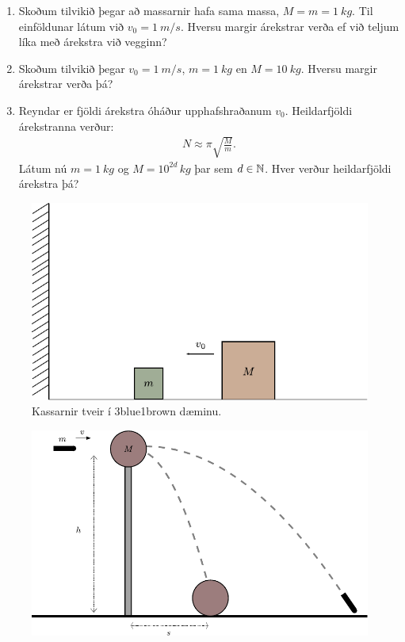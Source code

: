 \begin{enumerate}[label = \textbf{Dæmi \thechapter.\arabic*.}]
\begin{enumerate}[label = \textbf{(\alph*)}]
    \item Skoðum tilvikið þegar að massarnir hafa sama massa, $M = m = \SI{1}{kg}$. Til einföldunar látum við $v_0 = \SI{1}{m/s}$. Hversu margir árekstrar verða ef við teljum líka með árekstra við vegginn?
    
    \item Skoðum tilvikið þegar $v_0 = \SI{1}{m/s}$, $m = \SI{1}{kg}$ en $M = \SI{10}{kg}$. Hversu margir árekstrar verða þá?
    
    \item Reyndar er fjöldi árekstra óháður upphafshraðanum $v_0$. Heildarfjöldi árekstranna verður:
    \begin{align*}
        N \approx \pi \sqrt{\frac{M}{m}}.
    \end{align*}
    Látum nú $m = \SI{1}{kg}$ og $M = 10^{2d} \, \si{kg}$ þar sem $d \in \mathbb{N}$. Hver verður heildarfjöldi árekstra þá?
\end{enumerate}


\begin{figure}[H]
    \centering
    \includegraphics[scale = 0.8]{figures/3b1b.pdf}
    \caption{Kassarnir tveir í 3blue1brown dæminu.}
    \label{fig:3blue1brown}
\end{figure}

\begin{minipage}{\linewidth}
\begin{figure}
\centering
\vspace{-0.5cm}
\includegraphics[scale = 0.8]{figures/ipho1966.pdf}
   \label{fig:ipho1966}
\end{figure}


\end{minipage}
\end{enumerate}
